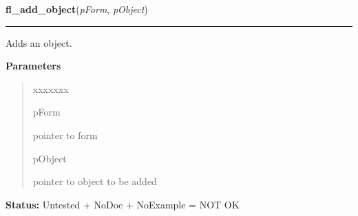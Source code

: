 \hspace{.8\funcindent}\begin{boxedminipage}{\funcwidth}

    \raggedright \textbf{fl\_add\_object}(\textit{pForm}, \textit{pObject})

    \vspace{-1.5ex}

    \rule{\textwidth}{0.5\fboxrule}
\setlength{\parskip}{2ex}
    Adds an object.

\setlength{\parskip}{1ex}
      \textbf{Parameters}
      \vspace{-1ex}

      \begin{quote}
        \begin{Ventry}{xxxxxxx}

          \item[pForm]

          pointer to form

          \item[pObject]

          pointer to object to be added

        \end{Ventry}

      \end{quote}

\textbf{Status:} Untested + NoDoc + NoExample = NOT OK



    \end{boxedminipage}

    \label{xformslib:library:fl_addto_form}

    \vspace{0.5ex}

